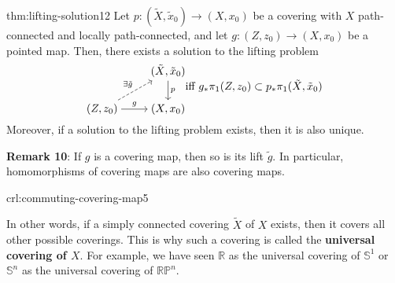 \documentclass[landscape, 8pt]{extarticle}
\begin{document}
\begin{multicols*}{3}
\begin{thm}{thm:lifting-solution}{12}
	Let $p : (\tilde{X}, \tilde{x}_{0}) \to (X, x_{0})$ be a covering with $X$ path-connected and locally path-connected, and let $g : (Z, z_{0}) \to (X, x_{0})$ be a pointed map. Then, there exists a solution to the lifting problem
\[\begin{tikzcd}[ampersand replacement=\&,cramped, column sep=small, row sep=small]
	\&\& {(\tilde{X}, \tilde{x}_0)} \\
	\\
	{(Z, z_0)} \&\& {(X, x_0)}
	\arrow["p", from=1-3, to=3-3]
	\arrow["{\exists \tilde{g}}", dashed, from=3-1, to=1-3]
	\arrow["g", from=3-1, to=3-3]
\end{tikzcd} \text{iff } g_{\ast}\pi_{1}(Z, z_{0}) \subset p_{\ast}\pi_{1}(\tilde{X}, \tilde{x}_{0})\]
Moreover, if a solution to the lifting problem exists, then it is also unique.

\tcbline
\textbf{Remark 10}: If $g$ is a covering map, then so is its lift $\tilde{g}$. In particular, homomorphisms of covering maps are also covering maps.
\end{thm}

\begin{crl}{crl:commuting-covering-map}{5}
	
 In other words, if a simply connected covering $\tilde{X}$ of $X$ exists, then it covers all other possible coverings. This is why such a covering is called the \textbf{universal covering of $X$}. For example, we have seen $\mathbb{R}$ as the universal covering of $\mathbb{S}^{1}$ or $\mathbb{S}^{n}$ as the universal covering of $\mathbb{RP}^{n}$.


\end{crl}
\end{multicols*}
\end{document}
